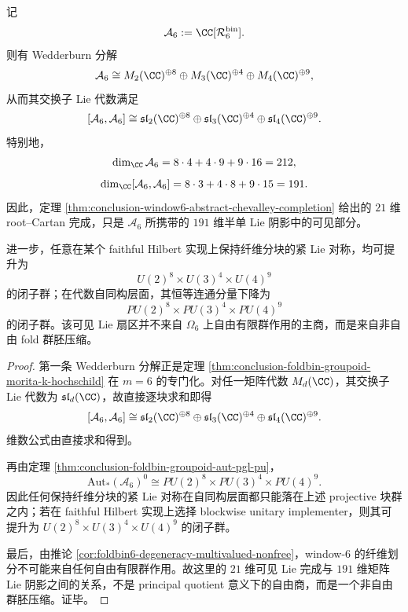 \begin{theorem}\label{thm:conclusion-window6-191dim-semisimple-shadow}
记
\[
\mathcal A_6:=\CC[\mathcal R_6^{\mathrm{bin}}].
\]
则有 Wedderburn 分解
\[
\mathcal A_6
\cong
M_2(\CC)^{\oplus 8}\oplus M_3(\CC)^{\oplus 4}\oplus M_4(\CC)^{\oplus 9},
\]
从而其交换子 Lie 代数满足
\[
[\mathcal A_6,\mathcal A_6]
\cong
\mathfrak{sl}_2(\CC)^{\oplus 8}
\oplus
\mathfrak{sl}_3(\CC)^{\oplus 4}
\oplus
\mathfrak{sl}_4(\CC)^{\oplus 9}.
\]
特别地，
\[
\dim_{\CC}\mathcal A_6=8\cdot 4+4\cdot 9+9\cdot 16=212,
\]
\[
\dim_{\CC}[\mathcal A_6,\mathcal A_6]
=8\cdot 3+4\cdot 8+9\cdot 15
=191.
\]
因此，定理 \ref{thm:conclusion-window6-abstract-chevalley-completion} 给出的 \(21\) 维 root--Cartan 完成，只是 \(\mathcal A_6\) 所携带的 \(191\) 维半单 Lie 阴影中的可见部分。

进一步，任意在某个 faithful Hilbert 实现上保持纤维分块的紧 Lie 对称，均可提升为
\[
U(2)^8\times U(3)^4\times U(4)^9
\]
的闭子群；在代数自同构层面，其恒等连通分量下降为
\[
PU(2)^8\times PU(3)^4\times PU(4)^9
\]
的闭子群。该可见 Lie 扇区并不来自 \(\Omega_6\) 上自由有限群作用的主商，而是来自非自由 fold 群胚压缩。
\end{theorem}
\begin{proof}
第一条 Wedderburn 分解正是定理 \ref{thm:conclusion-foldbin-groupoid-morita-k-hochschild} 在 \(m=6\) 的专门化。对任一矩阵代数 \(M_d(\CC)\)，其交换子 Lie 代数为 \(\mathfrak{sl}_d(\CC)\)，故直接逐块求和即得
\[
[\mathcal A_6,\mathcal A_6]
\cong
\mathfrak{sl}_2(\CC)^{\oplus 8}
\oplus
\mathfrak{sl}_3(\CC)^{\oplus 4}
\oplus
\mathfrak{sl}_4(\CC)^{\oplus 9}.
\]
维数公式由直接求和得到。

再由定理 \ref{thm:conclusion-foldbin-groupoid-aut-pgl-pu}，
\[
\mathrm{Aut}_{\ast}(\mathcal A_6)^0
\cong
PU(2)^8\times PU(3)^4\times PU(4)^9.
\]
因此任何保持纤维分块的紧 Lie 对称在自同构层面都只能落在上述 projective 块群之内；若在 faithful Hilbert 实现上选择 blockwise unitary implementer，则其可提升为 \(U(2)^8\times U(3)^4\times U(4)^9\) 的闭子群。

最后，由推论 \ref{cor:foldbin6-degeneracy-multivalued-nonfree}，window-\(6\) 的纤维划分不可能来自任何自由有限群作用。故这里的 \(21\) 维可见 Lie 完成与 \(191\) 维矩阵 Lie 阴影之间的关系，不是 principal quotient 意义下的自由商，而是一个非自由群胚压缩。证毕。
\end{proof}

